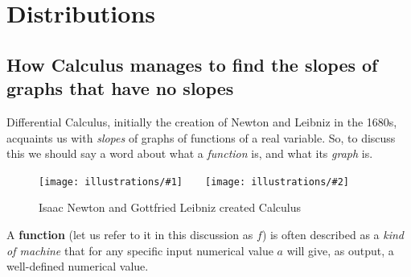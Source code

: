 \documentclass[openany]{book}
\newcommand{\illtwo}[4]{%
   \begin{figure}[H]\centering%
   \texttt{[image: illustrations/\#1]}$\qquad$\texttt{[image: illustrations/\#2]}%
   \caption{#4}%
    \end{figure}}
\theoremstyle{plain}
\theoremstyle{definition}
\newcommand{\RH}{Riemann Hypothesis\index{Riemann Hypothesis}}
\begin{document}
{%






\part{Distributions\label{part2}}


\chapter[Slopes of graphs that have no slopes]{How Calculus manages to
  find the slopes of graphs that have no slopes}\label{ch:calculusmanages}

Differential Calculus, initially the creation of Newton and Leibniz
in the 1680s, acquaints us with {\it slopes} of graphs of functions of
a real variable.  So, to discuss this we should say a word about what
a {\it function} is, and what its {\it graph} is.

 \illtwo{newton}{leibniz}{0.25}{Isaac Newton and Gottfried Leibniz created Calculus}


 A {\bf function} (let us refer to it in this discussion as $f$) is
 often described as a {\it kind of machine} that for any specific
 input numerical value $a$ will give, as output, a well-defined
 numerical value.

}
\end{document}
